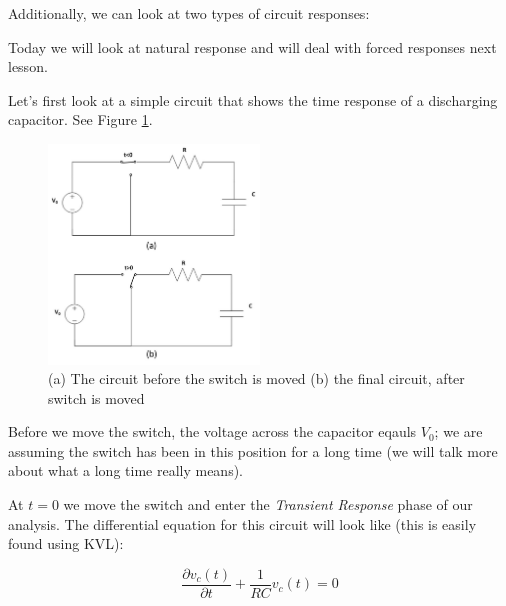 \documentclass{handout}
\begin{document}
Additionally, we can look at two types of circuit responses:

Today we will look at natural response and will deal with forced responses next lesson.

Let's first look at a simple circuit that shows the time response of a discharging capacitor.  See Figure \ref{fig: DischargingCapacitorCircuit}.

\begin{figure} [h!]
\centering
\includegraphics[width=0.5\textwidth]{DischargingCapacitorCircuit.jpg}
\caption{(a) The circuit before the switch is moved (b) the final circuit, after switch is moved}
\label{fig: DischargingCapacitorCircuit}
\end{figure}

Before we move the switch, the voltage across the capacitor eqauls $V_0$; we are assuming the switch has been in this position for a long time (we will talk more about what a long time really means).

At $t=0$ we move the switch and enter the {\em Transient Response} phase of our analysis.  The differential equation for this circuit will look like (this is easily found using KVL):

\begin{equation}
\frac{\partial v_c(t)}{\partial t} +\frac{1}{RC} v_c(t) = 0
\end{equation}
\end{document}
